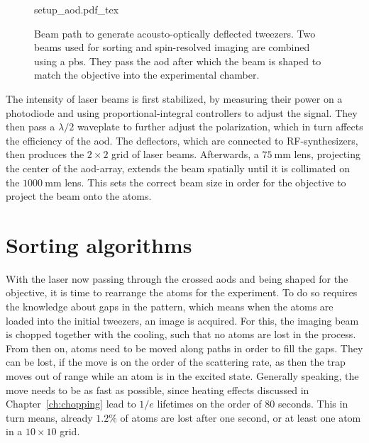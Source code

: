 \begin{figure}[t]%
\label{fig:setup_aod}
\centering
	{setup_aod.pdf_tex}
	\caption{Beam path to generate acousto-optically deflected tweezers. Two beams used for sorting and spin-resolved imaging are combined using a \ac{pbs}. They pass the \ac{aod} after which the beam is shaped to match the objective into the experimental chamber.}
\end{figure}

The intensity of laser beams is first stabilized, by measuring their power on a photodiode and using proportional-integral controllers to adjust the signal. They then pass a $\lambda/2$ waveplate to further adjust the polarization, which in turn affects the efficiency of the \ac{aod}. The deflectors, which are connected to RF-synthesizers, then produces the $2\times2$ grid of laser beams. Afterwards, a $\SI{75}{\milli\meter}$ lens, projecting the center of the \ac{aod}-array, extends the beam spatially until it is collimated on the $\SI{1000}{\milli\meter}$ lens. This sets the correct beam size in order for the objective to project the beam onto the atoms.

\section{Sorting algorithms}

With the laser now passing through the crossed \acp{aod} and being shaped for the objective, it is time to rearrange the atoms for the experiment. To do so requires the knowledge about gaps in the pattern, which means when the atoms are loaded into the initial tweezers, an image is acquired. For this, the imaging beam is chopped together with the cooling, such that no atoms are lost in the process. From then on, atoms need to be moved along paths in order to fill the gaps. They can be lost, if the move is on the order of the scattering rate, as then the trap moves out of range while an atom is in the excited state. Generally speaking, the move needs to be as fast as possible, since heating effects discussed in Chapter~\ref{ch:chopping} lead to $1/e$ lifetimes on the order of 80 seconds. This in turn means, already $1.2\%$ of atoms are lost after one second, or at least one atom in a $10\times10$ grid.

